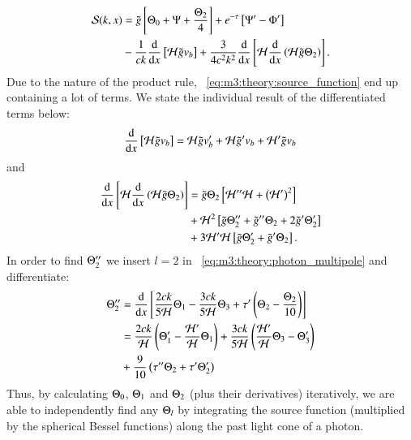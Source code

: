     \begin{equation}\label{eq:m3:theory:source_function}
        \begin{split}
            \mathcal{S}(k,x) &= \tilde{g}\left[\Theta_0+\Psi+\frac{\Theta_2}{4}\right] + e^{-\tau}\left[\Psi'-\Phi'\right]\\
            &-\frac{1}{ck}\dv{}{x}\left[\mathcal{H}\tilde{g}v_b\right] + \frac{3}{4c^2k^2}\dv{}{x}\left[\mathcal{H}\dv{}{x}\left(\mathcal{H}\tilde{g}\Theta_2\right)\right].
        \end{split}
    \end{equation}
    Due to the nature of the product rule, ~\cref{eq:m3:theory:source_function} end up containing a lot of terms. We state the individual result of the differentiated terms below:
    \begin{equation}\label{eq:m3:theory:dvHgv_b}
        \dv{}{x}\left[\mathcal{H}\tilde{g}v_b\right] = \mathcal{H}\tilde{g}v_b' + \mathcal{H}\tilde{g}'v_b + \mathcal{H}'\tilde{g}v_b
    \end{equation}
    and
    \begin{equation}\label{eq:m3:theory:dvHdvHgT}
        \begin{split}
            \dv{}{x}\left[\mathcal{H}\dv{}{x}\left(\mathcal{H}\tilde{g}\Theta_2\right)\right] &= \tilde{g}\Theta_2\left[\mathcal{H}''\mathcal{H} + \left(\mathcal{H}'\right)^2\right] \\
            &+\mathcal{H}^2\left[\tilde{g}\Theta_2'' + \tilde{g}''\Theta_2 + 2\tilde{g}'\Theta_2'\right] \\
            &+3\mathcal{H}'\mathcal{H}\left[\tilde{g}\Theta_2'+\tilde{g}'\Theta_2\right].
        \end{split}
    \end{equation}
    In order to find $\Theta_2''$ we insert $l=2$ in ~\cref{eq:m3:theory:photon_multipole} and differentiate:
    \begin{equation}\label{eq:m3:theory:dipole_double_deriv}
        \begin{split}
            \Theta_2'' &= \dv{}{x}\left[\frac{2ck}{5\mathcal{H}}\Theta_1-\frac{3ck}{5\mathcal{H}}\Theta_3 + \tau'\left(\Theta_2-\frac{\Theta_2}{10}\right)\right] \\
            &= \frac{2ck}{\mathcal{H}}\left(\Theta_1'-\frac{\mathcal{H}'}{\mathcal{H}}\Theta_1\right) + \frac{3ck}{5\mathcal{H}}\left(\frac{\mathcal{H}'}{\mathcal{H}}\Theta_3 - \Theta_3'\right)\\
            &+ \frac{9}{10}\left(\tau''\Theta_2 + \tau'\Theta_2'\right)
        \end{split}
    \end{equation}
    Thus, by calculating $\Theta_0$, $\Theta_1$ and $\Theta_2$ (plus their derivatives) iteratively, we are able to independently find any $\Theta_l$ by integrating the source function (multiplied by the spherical Bessel functions) along the past light cone of a photon. 



